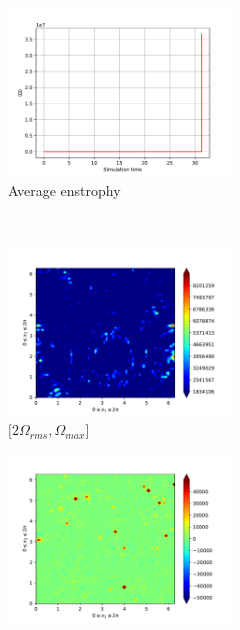 \begin{figure}[H]
    \begin{subfigure}[H]{0.45\textwidth}
        \includegraphics[height=1.75in]{media/run-cds-65-25k/enst-average2449}
        \caption{Average enstrophy}
    \end{subfigure}
    ~
    \begin{subfigure}[H]{0.45\textwidth}
        \includegraphics[height=1.75in]{media/run-cds-65-25k/enst-2-2449}
        \caption{$[2\Omega_{rms}, \Omega_{max} $] }
    \end{subfigure}
    \newline
    \begin{subfigure}[H]{0.45\textwidth}
        \includegraphics[height=1.75in]{media/run-cds-65-25k/enst-2449}

\end{subfigure}
\end{figure}
